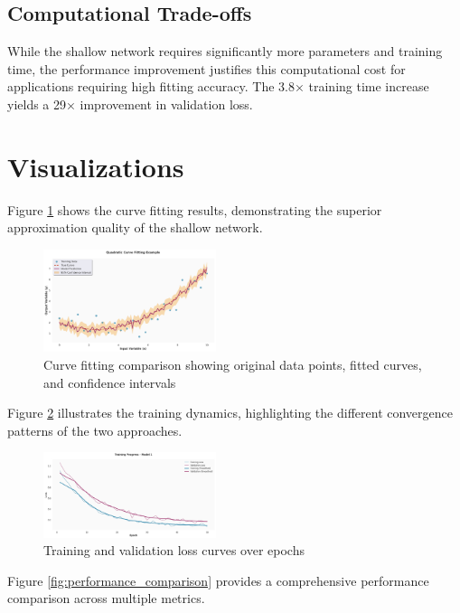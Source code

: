 \documentclass[11pt,twocolumn]{article}
\begin{document}
\subsection{Computational Trade-offs}

While the shallow network requires significantly more parameters and training time, the performance improvement justifies this computational cost for applications requiring high fitting accuracy. The 3.8× training time increase yields a 29× improvement in validation loss.

\section{Visualizations}

Figure \ref{fig:curve_fitting} shows the curve fitting results, demonstrating the superior approximation quality of the shallow network.

\begin{figure}[H]
\centering
\includegraphics[width=0.45\textwidth]{images/curve_fitting_demo.png}
\caption{Curve fitting comparison showing original data points, fitted curves, and confidence intervals}
\label{fig:curve_fitting}
\end{figure}

Figure \ref{fig:loss_curves} illustrates the training dynamics, highlighting the different convergence patterns of the two approaches.

\begin{figure}[H]
\centering
\includegraphics[width=0.45\textwidth]{images/loss_curves_demo.png}
\caption{Training and validation loss curves over epochs}
\label{fig:loss_curves}
\end{figure}

Figure \ref{fig:performance_comparison} provides a comprehensive performance comparison across multiple metrics.
\end{document}
